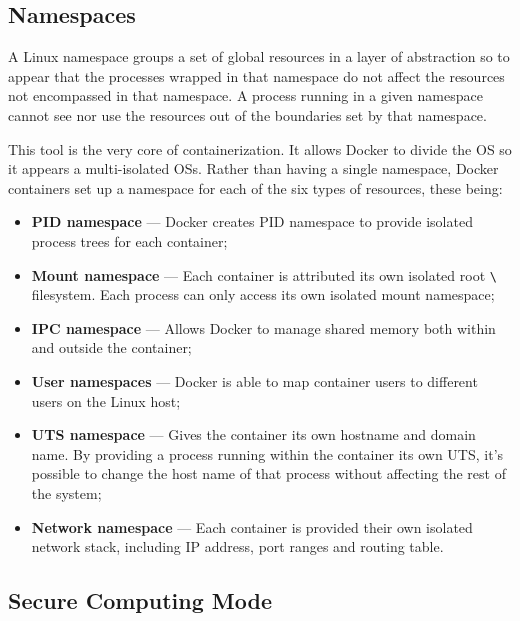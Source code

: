 \subsection{Namespaces}
\label{ssec::security:namespaces}

A Linux namespace groups a set of global resources in a layer of abstraction so to appear that the processes wrapped in that namespace do not affect the resources not encompassed in that namespace\cite{namespaces-linux, namespaces}. A process running in a given namespace cannot see nor use the resources out of the boundaries set by that namespace.

This tool is the very core of containerization. It allows Docker to divide the \ac{OS} so it appears a multi-isolated \acp{OS}\cite{namespaces-docker}. Rather than having a single namespace, Docker containers set up a namespace for each of the six types of resources\cite{Poulton2020-ju}, these being:

\begin{itemize}
    \item \textbf{\ac{PID} namespace} --- Docker creates \ac{PID} namespace to provide isolated process trees for each container;
    
    \item \textbf{Mount namespace} --- Each container is attributed its own isolated root \texttt{\textbackslash} filesystem. Each process can only access its own isolated mount namespace;
    
    \item \textbf{\ac{IPC} namespace} --- Allows Docker to manage shared memory both within and outside the container;
    
    \item \textbf{User namespaces} --- Docker is able to map container users to different users on the Linux host;
    
    \item \textbf{\ac{UTS} namespace} --- Gives the container its own hostname and domain name. By providing a process running within the container its own \ac{UTS}, it's possible to change the host name of that process without affecting the rest of the system;
    
    \item \textbf{Network namespace} --- Each container is provided their own isolated network stack, including \acs{IP} address, port ranges and routing table.
\end{itemize}


\subsection{Secure Computing Mode}
\label{ssec::security:sec-compt}

